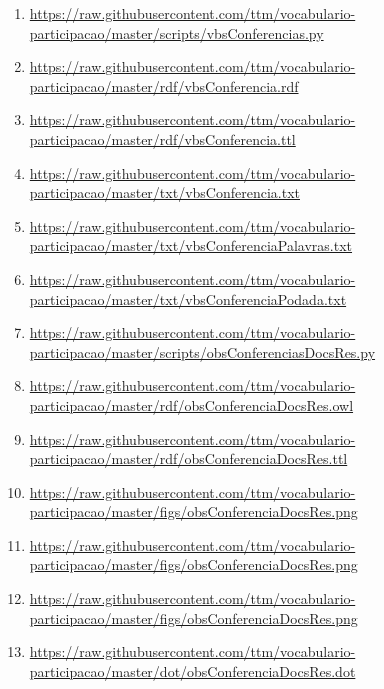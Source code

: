 \documentclass[12pt]{article}
\begin{document}
{\begin{enumerate}
    \item \url{https://raw.githubusercontent.com/ttm/vocabulario-participacao/master/scripts/vbsConferencias.py}\label{i:12}
    \item \url{https://raw.githubusercontent.com/ttm/vocabulario-participacao/master/rdf/vbsConferencia.rdf}\label{i:13}
    \item \url{https://raw.githubusercontent.com/ttm/vocabulario-participacao/master/rdf/vbsConferencia.ttl}\label{i:14}
    \item \url{https://raw.githubusercontent.com/ttm/vocabulario-participacao/master/txt/vbsConferencia.txt}\label{i:16}
    \item \url{https://raw.githubusercontent.com/ttm/vocabulario-participacao/master/txt/vbsConferenciaPalavras.txt}\label{i:17}
    \item \url{https://raw.githubusercontent.com/ttm/vocabulario-participacao/master/txt/vbsConferenciaPodada.txt}\label{i:18}

 \item \url{https://raw.githubusercontent.com/ttm/vocabulario-participacao/master/scripts/obsConferenciasDocsRes.py}    \label{i:6a}
     \item \url{https://raw.githubusercontent.com/ttm/vocabulario-participacao/master/rdf/obsConferenciaDocsRes.owl}    \label{i:7a}
     \item \url{https://raw.githubusercontent.com/ttm/vocabulario-participacao/master/rdf/obsConferenciaDocsRes.ttl}    \label{i:8a}
    \item \url{https://raw.githubusercontent.com/ttm/vocabulario-participacao/master/figs/obsConferenciaDocsRes.png}    \label{i:9a}
    \item \url{https://raw.githubusercontent.com/ttm/vocabulario-participacao/master/figs/obsConferenciaDocsRes.png}   \label{i:10a}
    \item \url{https://raw.githubusercontent.com/ttm/vocabulario-participacao/master/figs/obsConferenciaDocsRes.png}   \label{i:11a}
     \item \url{https://raw.githubusercontent.com/ttm/vocabulario-participacao/master/dot/obsConferenciaDocsRes.dot} \label{i:11_1a}


\end{enumerate}}
\end{document}
